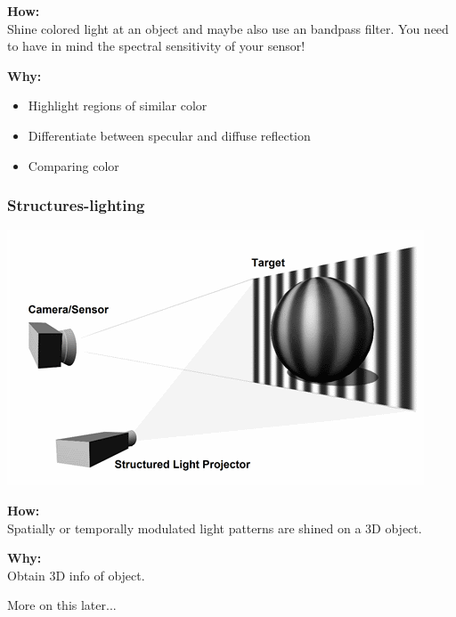 \documentclass[a4paper, fontsize=8pt, landscape, DIV=1]{scrartcl}
\begin{document}
\begin{multicols*}{4}
		\par 
		\textbf{How:}\\
		Shine colored light at an object and maybe also use an bandpass filter. You need to have in mind the spectral sensitivity of your sensor!
		\par 
		\textbf{Why:}\\
		\vspace{-0.5cm}
		\begin{itemize}[noitemsep]
			\item Highlight regions of similar color
			\item Differentiate between specular and diffuse reflection
			\item Comparing color
		\end{itemize}
		
		\subsubsection{Structures-lighting}
		\begin{center}
			\includegraphics[width=0.7\columnwidth]{images//ImageAcq/structured_lighting.png}\\
		\end{center}
		\textbf{How:}\\
		Spatially or temporally modulated light patterns are shined on a 3D object.
		\par 
		\textbf{Why:}\\
		Obtain 3D info of object.
		\par
		More on this later...
	

\end{multicols*}
\end{document}
